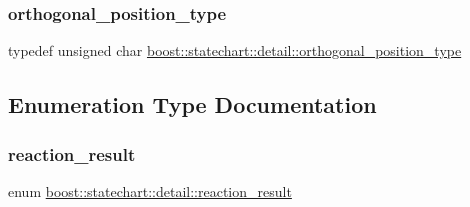 \subsubsection{\texorpdfstring{orthogonal\+\_\+position\+\_\+type}{orthogonal\_position\_type}}
{\footnotesize\ttfamily typedef unsigned char \mbox{\hyperlink{namespaceboost_1_1statechart_1_1detail_a3bedea0b807a16fa222733417183d2c9}{boost\+::statechart\+::detail\+::orthogonal\+\_\+position\+\_\+type}}}



\subsection{Enumeration Type Documentation}
\mbox{\label{namespaceboost_1_1statechart_1_1detail_ab091bbb4c29327fb46ee479ea1b7255b}} 
\subsubsection{\texorpdfstring{reaction\+\_\+result}{reaction\_result}}
{\footnotesize\ttfamily enum \mbox{\hyperlink{namespaceboost_1_1statechart_1_1detail_ab091bbb4c29327fb46ee479ea1b7255b}{boost\+::statechart\+::detail\+::reaction\+\_\+result}}}


